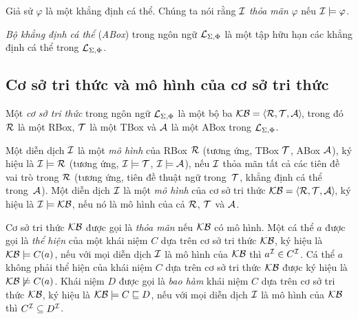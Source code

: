 Giả sử $\varphi$ là một khẳng định cá thể. Chúng ta nói rằng $\mathcal{I}$ {\em thỏa mãn} $\varphi$ nếu $\mathcal{I} \models \varphi$.

\begin{Definition}
\label{def:ABox}
{\em Bộ khẳng định cá thể} ({\em ABox}) trong ngôn ngữ $\mathcal{L}_{\Sigma,\Phi}$ là một tập hữu hạn các khẳng định cá thể trong $\mathcal{L}_{\Sigma,\Phi}$.\myend
\end{Definition}

\subsection{Cơ sở tri thức và mô hình của cơ sở tri thức}
\label{sec:Chap1.KnowledgeBase}

\begin{Definition}
Một {\em cơ sở tri thức} trong ngôn ngữ $\mathcal{L}_{\Sigma,\Phi}$ là một bộ ba \mbox{$\mathcal{KB} = \left\langle\mathcal{R}, \mathcal{T}, \mathcal{A}\right\rangle\!$}, trong đó $\mathcal{R}$ là một RBox, $\mathcal{T}$ là một TBox và $\mathcal{A}$ là một ABox trong $\mathcal{L}_{\Sigma,\Phi}$.\myend
\end{Definition}

\begin{Definition}[Mô hình]
Một diễn dịch $\mathcal{I}$ là một {\em mô hình} của RBox $\mathcal{R}$ (tương ứng, TBox $\mathcal{T}$, ABox $\mathcal{A}$), ký hiệu là $\mathcal{I} \models \mathcal{R}$ (tương ứng, $\mathcal{I} \models \mathcal{T}$, $\mathcal{I} \models \mathcal{A}$), nếu $\mathcal{I}$ thỏa mãn tất cả các tiên đề vai trò trong $\mathcal{R}$ (tương ứng, tiên đề thuật ngữ trong~$\mathcal{T}$, khẳng định cá thể trong~$\mathcal{A}$).
Một diễn dịch $\mathcal{I}$ là một {\em mô hình} của cơ sở tri thức $\mathcal{KB}=\left\langle\mathcal{R},\mathcal{T}, \mathcal{A}\right\rangle\!$, ký hiệu là $\mathcal{I} \models \mathcal{KB}$, nếu nó là mô hình của cả $\mathcal{R}$, $\mathcal{T}$ và $\mathcal{A}$.\myend
\end{Definition}

Cơ sở tri thức $\mathcal{KB}$ được gọi là {\em thỏa mãn} nếu $\mathcal{KB}$ có mô hình. 
Một cá thể $a$ được gọi là {\em thể hiện} của một khái niệm $C$ dựa trên cơ sở tri thức $\mathcal{KB}$, ký hiệu là $\mathcal{KB} \models C(a)$, nếu với mọi diễn dịch $\mathcal{I}$ là mô hình của $\mathcal{KB}$ thì $a^{\mathcal{I}} \in C^{\mathcal{I}}$. Cá thể $a$ không phải thể hiện của khái niệm $C$ dựa trên cơ sở tri thức $\mathcal{KB}$ được ký hiệu là $\mathcal{KB} \not \models C(a)$.
%
Khái niệm $D$ được gọi là {\em bao hàm} khái niệm $C$ dựa trên cơ sở tri thức $\mathcal{KB}$, ký hiệu là $\mathcal{KB} \models C \sqsubseteq D$, nếu với mọi diễn dịch $\mathcal{I}$ là mô hình của $\mathcal{KB}$ thì $C^{\mathcal{I}} \subseteq D^{\mathcal{I}}$.

